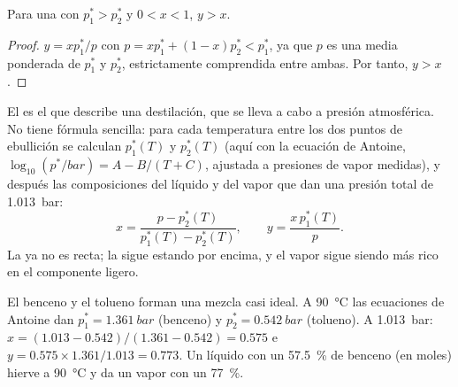 \begin{proposition}\label{prop:b2:liquid-vapour-diagrams:richer}
Para una  con $p_1^* > p_2^*$ y $0 < x < 1$, $y > x$.
\end{proposition}

\begin{proof}
$y = xp_1^*/p$ con $p = xp_1^* + (1 - x)p_2^* < p_1^*$, ya que $p$ es una
media ponderada de $p_1^*$ y $p_2^*$, estrictamente comprendida entre ambas. Por tanto, $y >
x$.
\end{proof}

El  es el que describe una destilación, que se lleva a cabo a
presión atmosférica. No tiene fórmula sencilla: para cada temperatura entre
los dos puntos de ebullición se calculan $p_1^*(T)$ y $p_2^*(T)$ (aquí con la
ecuación de Antoine, $\log_{10}(p^*/\unit{bar}) = A - B/(T + C)$, ajustada a
presiones de vapor medidas), y después las composiciones del líquido y del vapor que
dan una presión total de \qty{1.013}{bar}:
\[
  x = \frac{p - p_2^*(T)}{p_1^*(T) - p_2^*(T)}, \qquad y = \frac{x\,p_1^*(T)}{p} .
\]
La  ya no es recta; la  sigue estando por encima,
y el vapor sigue siendo más rico en el componente ligero.

\begin{example}\label{ex:b2:liquid-vapour-diagrams:benzene-toluene}
El benceno y el tolueno forman una mezcla casi ideal. A \qty{90}{\degreeCelsius}
las ecuaciones de Antoine dan $p_1^* = \qty{1.361}{bar}$ (benceno) y $p_2^* =
\qty{0.542}{bar}$ (tolueno). A \qty{1.013}{bar}: $x = (1.013 - 0.542)/(1.361 -
0.542) = 0.575$ e $y = 0.575 \times 1.361/1.013 = 0.773$. Un líquido con un 57.5~\%
de benceno (en moles) hierve a \qty{90}{\degreeCelsius} y da un vapor con un
77~\%.
\end{example}

